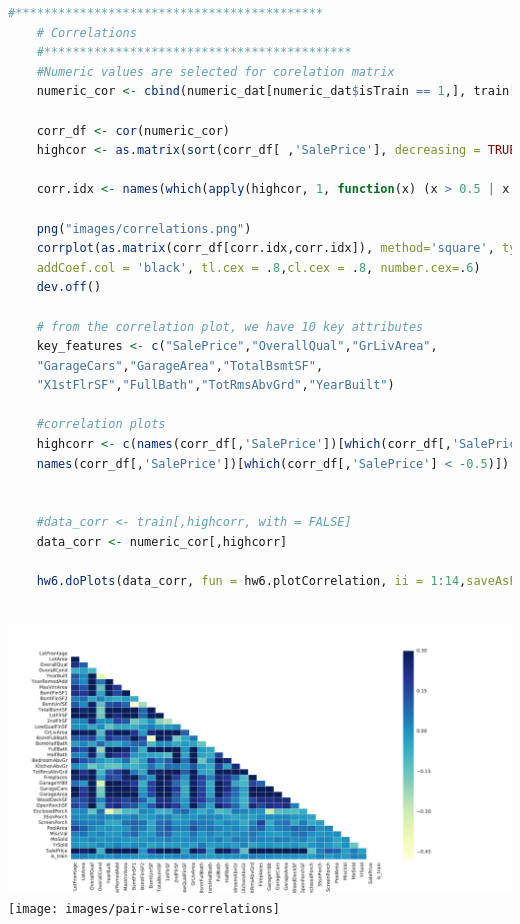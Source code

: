 \documentclass[sigconf]{acmart}
\begin{document}
	
	\begin{lstlisting}[language=R]
	#*******************************************
	# Correlations
	#*******************************************
	#Numeric values are selected for corelation matrix
	numeric_cor <- cbind(numeric_dat[numeric_dat$isTrain == 1,], train['SalePrice'])
	
	corr_df <- cor(numeric_cor)
	highcor <- as.matrix(sort(corr_df[ ,'SalePrice'], decreasing = TRUE))
	
	corr.idx <- names(which(apply(highcor, 1, function(x) (x > 0.5 | x < -0.5))))
	
	png("images/correlations.png")
	corrplot(as.matrix(corr_df[corr.idx,corr.idx]), method='square', type = 'upper',
	addCoef.col = 'black', tl.cex = .8,cl.cex = .8, number.cex=.6)
	dev.off()
	
	# from the correlation plot, we have 10 key attributes
	key_features <- c("SalePrice","OverallQual","GrLivArea",
	"GarageCars","GarageArea","TotalBsmtSF", 
	"X1stFlrSF","FullBath","TotRmsAbvGrd","YearBuilt")
	
	#correlation plots
	highcorr <- c(names(corr_df[,'SalePrice'])[which(corr_df[,'SalePrice'] > 0.5)], 
	names(corr_df[,'SalePrice'])[which(corr_df[,'SalePrice'] < -0.5)])
	
	
	#data_corr <- train[,highcorr, with = FALSE]
	data_corr <- numeric_cor[,highcorr]
	
	hw6.doPlots(data_corr, fun = hw6.plotCorrelation, ii = 1:14,saveAsFile = "pair-wise-correlations.png", height = 400)
	
	\end{lstlisting}
	
	\begin{center}
		\includegraphics[width=0.99\columnwidth]{images/correlations}		
		\texttt{[image: images/pair-wise-correlations]}
	\end{center}
	
\end{document}
